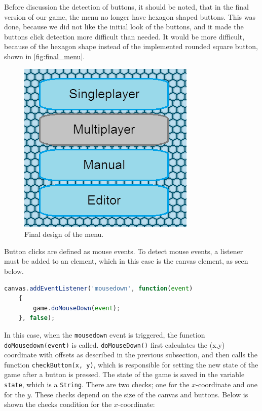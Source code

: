 Before discussion the detection of buttons, it should be noted, that in the final version of our game, the menu no longer have hexagon shaped buttons. This was done, because we did not like the initial look of the buttons, and it made the buttons click detection more difficult than needed. It would be more difficult, because of the hexagon shape instead of the implemented rounded square button, shown in \autoref{fig:final_menu}.

\begin{figure}[h]
	\includegraphics[width=\textwidth]{img/final_menu.png}
	\caption{Final design of the menu.}
	\label{fig:final_menu}
\end{figure}

Button clicks are defined as mouse events. To detect mouse events, a listener must be added to an element, which in this case is the canvas element, as seen below.

\begin{lstlisting}[language=JavaScript, caption=Add event listener to canvas]
canvas.addEventListener('mousedown', function(event)
	{
		game.doMouseDown(event);
	}, false);
\end{lstlisting}

In this case, when the \verb|mousedown| event is triggered, the function\\
\verb|doMousedown(event)| is called. \verb|doMouseDown()| first calculates the (x,y) coordinate with offsets as described in the previous subsection, and then calls the function \verb|checkButton(x, y)|, which is responsible for setting the new state of the game after a button is pressed. The state of the game is saved in the variable \verb|state|, which is a \verb|String|. There are two checks; one for the $x$-coordinate and one for the $y$. These checks depend on the size of the canvas and buttons. Below is shown the checks condition for the $x$-coordinate:

